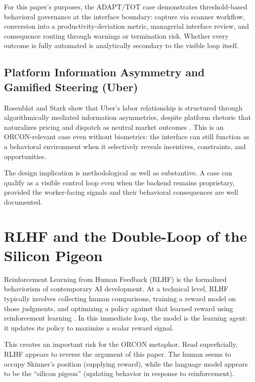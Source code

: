 \documentclass[runningheads]{llncs}
\begin{document}
For this paper's purposes, the ADAPT/TOT case demonstrates threshold-based behavioral governance at the interface boundary: capture via scanner workflow, conversion into a productivity-deviation metric, managerial interface review, and consequence routing through warnings or termination risk. Whether every outcome is fully automated is analytically secondary to the visible loop itself.

\subsection{Platform Information Asymmetry and Gamified Steering (Uber)}

Rosenblat and Stark show that Uber's labor relationship is structured through algorithmically mediated information asymmetries, despite platform rhetoric that naturalizes pricing and dispatch as neutral market outcomes \cite{rosenblat2016uber}. This is an ORCON-relevant case even without biometrics: the interface can still function as a behavioral environment when it selectively reveals incentives, constraints, and opportunities.

The design implication is methodological as well as substantive. A case can qualify as a visible control loop even when the backend remains proprietary, provided the worker-facing signals and their behavioral consequences are well documented.

\section{RLHF and the Double-Loop of the Silicon Pigeon}

Reinforcement Learning from Human Feedback (RLHF) is the formalized behaviorism of contemporary AI development. At a technical level, RLHF typically involves collecting human comparisons, training a reward model on those judgments, and optimizing a policy against that learned reward using reinforcement learning \cite{christiano2017preferences,ouyang2022training,sutton2018reinforcement}. In this immediate loop, the model is the learning agent: it updates its policy to maximize a scalar reward signal.

This creates an important risk for the ORCON metaphor. Read superficially, RLHF appears to reverse the argument of this paper. The human seems to occupy Skinner's position (supplying reward), while the language model appears to be the ``silicon pigeon'' (updating behavior in response to reinforcement).
\end{document}
